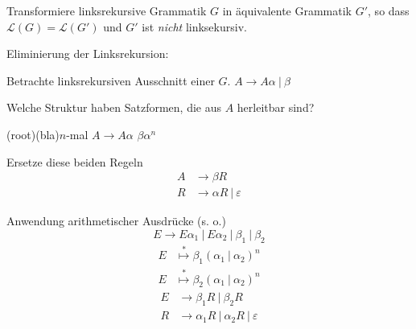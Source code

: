 \begin{description}
\begin{description}
\begin{center}
             \end{center}
     \item[Idee] Transformiere linksrekursive Grammatik $G$ in äquivalente Grammatik $G'$, so dass $\mathcal{L}(G) = \mathcal L(G')$ und 
                 $G'$ ist \emph{nicht} linksekursiv.
     \item[Prinzip] Eliminierung der Linksrekursion:
         \begin{description}
          \item Betrachte linksrekursiven Ausschnitt einer $G$. $A \to A\alpha\ |\ \beta$
          \item Welche Struktur haben Satzformen, die aus $A$ herleitbar sind?
          \begin{center}
              \psbrace[rot=225,nodesepA=-2cm](root)(bla){$n$-mal $A \to A\alpha$}
              $\beta \alpha^n$
          \end{center}
          \item Ersetze diese beiden Regeln
              \begin{align*}
               A &\to \beta R \\
               R &\to \alpha R\ |\ \varepsilon
              \end{align*}
         \end{description}
     \item[Beispiel] Anwendung arithmetischer Ausdrücke (s. o.)
         \[ E \to E \alpha_1\ |\ E\alpha_2\ |\ \beta_1\ |\ \beta_2\]
         \begin{align*}
             E &\overset{*}{\mapsto} \beta_1 (\alpha_1\ |\ \alpha_2)^n \\
             E &\overset{*}{\mapsto} \beta_2 (\alpha_1\ |\ \alpha_2)^n
         \end{align*}
         \begin{align*}
             E &\to \beta_1 R\ |\ \beta_2 R \\
             R &\to \alpha_1 R\ |\ \alpha_2 R\ |\ \varepsilon
         \end{align*}

\end{description}
\end{description}

